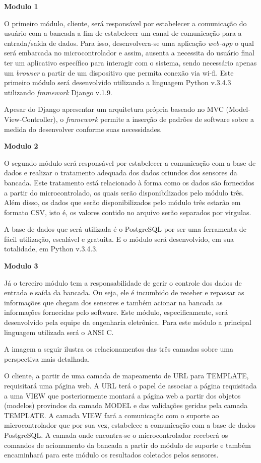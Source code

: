 	\textbf{Modulo 1}

	O primeiro módulo, cliente, será responsável por estabelecer a comunicação do usuário com a bancada a fim de estabelecer um canal de comunicação para a entrada/saída de dados. Para isso, desenvolvera-se uma aplicação \textit{web-app} o qual será embarcada no microcontrolador e assim, ausenta a necessita do usuário final ter um aplicativo específico para interagir com o sistema, sendo necessário apenas um \textit{browser} a partir de um dispositivo que permita conexão via wi-fi. Este primeiro módulo será desenvolvido utilizando a linguagem Python v.3.4.3 utilizando \textit{framework} Django v.1.9. 

	Apesar do Django apresentar um arquitetura própria baseado no MVC (Model-View-Controller), o \textit{framework} permite a inserção de padrões de software sobre a medida do desenvolver conforme suas necessidades.

	\textbf{Modulo 2}

	O segundo módulo será responsável por estabelecer a comunicação com a base de dados e realizar o tratamento adequada dos dados oriundos dos sensores da bancada. Este tratamento está relacionado à forma como os dados são fornecidos a partir do microcontrolado, os quais serão disponibilizados pelo módulo três. Além disso, os dados que serão disponibilizados pelo módulo três estarão em formato CSV, isto é, os valores contido no arquivo serão separados por virgulas.

	A base de dados que será utilizada é o PostgreSQL por ser uma ferramenta de fácil utilização, escalável e gratuita. E o módulo será desenvolvido, em sua totalidade, em Python v.3.4.3.


	\textbf{Modulo 3}

	Já o terceiro módulo tem a responsabilidade de gerir o controle dos dados de entrada e saída da bancada. Ou seja, ele é incumbido de receber e repassar as informações que chegam dos sensores e também acionar na bancada as informações fornecidas pelo software. Este módulo, especificamente, será desenvolvido pela equipe da engenharia eletrônica. Para este módulo a principal linguagem utilizada será o ANSI C.


	A imagem a seguir ilustra os relacionamentos das três camadas sobre uma perspectiva mais detalhada.


	O cliente, a partir de uma camada de mapeamento de URL para TEMPLATE, requisitará uma página web. A URL terá o papel de associar a página requisitada a uma VIEW que posteriormente montará a página web a partir dos objetos (modelos) provindos da camada MODEL e das validações geridas pela camada TEMPLATE. A camada VIEW fará a comunicação com o suporte ao microcontrolador que por sua vez, estabelece a comunicação com a base de dados PostgreSQL. A camada onde encontra-se o microcontrolador receberá os comandos de acionamento da bancada a partir do módulo de suporte e também encaminhará para este módulo os resultados coletados pelos sensores.

